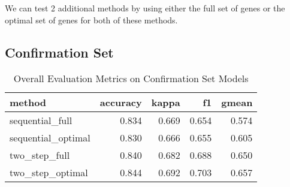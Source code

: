 \documentclass[
]{report}
\begin{document}
We can test 2 additional methods by using either the full set of genes or the optimal set of genes for both of these methods.

\hypertarget{confirmation-set}{%
\subsection{Confirmation Set}\label{confirmation-set}}

\begin{table}

\caption{\label{tab:conf-eval-overall}Overall Evaluation Metrics on Confirmation Set Models}
\centering
\begin{tabular}[t]{l|r|r|r|r}
\hline
method & accuracy & kappa & f1 & gmean\\
\hline
sequential\_full & 0.834 & 0.669 & 0.654 & 0.574\\
\hline
sequential\_optimal & 0.830 & 0.666 & 0.655 & 0.605\\
\hline
two\_step\_full & 0.840 & 0.682 & 0.688 & 0.650\\
\hline
two\_step\_optimal & 0.844 & 0.692 & 0.703 & 0.657\\
\hline
\end{tabular}
\end{table}
\end{document}
